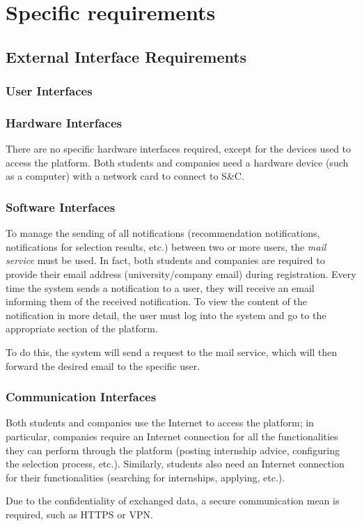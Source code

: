 \chapter{Specific requirements}
	\section{External Interface Requirements}
		\subsection{User Interfaces}
		\subsection{Hardware Interfaces}
			There are no specific hardware interfaces required, except for the devices used to access the platform. Both students and companies need a hardware device (such as a computer) with a network card to connect to S\&C.
		\subsection{Software Interfaces}
				To manage the sending of all notifications (recommendation notifications, notifications for selection results, etc.) between two or more users, the \textit{mail service} must be used. In fact, both students and companies are required to provide their email address (university/company email) during registration. Every time the system sends a notification to a user, they will receive an email informing them of the received notification. To view the content of the notification in more detail, the user must log into the system and go to the appropriate section of the platform.
				
				To do this, the system will send a request to the mail service, which will then forward the desired email to the specific user.
		\subsection{Communication Interfaces}
			Both students and companies use the Internet to access the platform; in particular, companies require an Internet connection for all the functionalities they can perform through the platform (posting internship advice, configuring the selection process, etc.). Similarly, students also need an Internet connection for their functionalities (searching for internships, applying, etc.).
			
			Due to the confidentiality of exchanged data, a secure communication mean is required, such as HTTPS or VPN.
